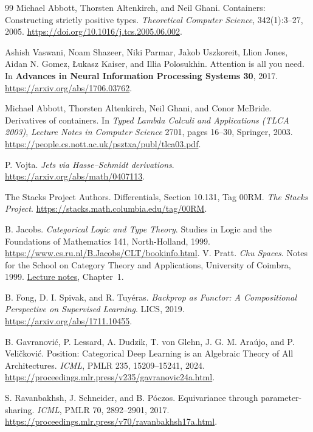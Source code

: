 \documentclass[11pt,a4paper]{article}
\theoremstyle{definition}
\theoremstyle{remark}\newaliascnt{remark}{theorem}
\numberwithin{equation}{section}
\begin{document}
\begin{thebibliography}{99}
Michael Abbott, Thorsten Altenkirch, and Neil Ghani.
\newblock Containers: Constructing strictly positive types.
\newblock \emph{Theoretical Computer Science}, 342(1):3--27, 2005.
\newblock \url{https://doi.org/10.1016/j.tcs.2005.06.002}.

Ashish Vaswani, Noam Shazeer, Niki Parmar, Jakob Uszkoreit,
Llion Jones, Aidan N. Gomez, \L ukasz Kaiser, and Illia Polosukhin.
\newblock Attention is all you need.
\newblock In \textbf{Advances in Neural Information Processing Systems 30},
2017.
\newblock \url{https://arxiv.org/abs/1706.03762}.

Michael Abbott, Thorsten Altenkirch, Neil Ghani, and Conor McBride.
\newblock Derivatives of containers.
\newblock In \emph{Typed Lambda Calculi and Applications (TLCA 2003)},
\emph{Lecture Notes in Computer Science} 2701, pages 16--30, Springer, 2003.
\newblock \url{https://people.cs.nott.ac.uk/psztxa/publ/tlca03.pdf}.

P. Vojta. \emph{Jets via Hasse--Schmidt derivations}.
\url{https://arxiv.org/abs/math/0407113}.

The Stacks Project Authors.
\newblock Differentials, Section 10.131, Tag 00RM.
\newblock \emph{The Stacks Project}.
\newblock \url{https://stacks.math.columbia.edu/tag/00RM}.

 B. Jacobs.
\emph{Categorical Logic and Type Theory}. Studies in Logic and the Foundations of Mathematics 141, North-Holland, 1999.
\url{https://www.cs.ru.nl/B.Jacobs/CLT/bookinfo.html}.
 V. Pratt. \emph{Chu Spaces}. Notes for the School on Category Theory and Applications, University of Coimbra, 1999.
\href{https://ncatlab.org/nlab/files/Pratt-ChuSpaces.pdf}{Lecture notes}, Chapter~1.

B. Fong, D. I. Spivak, and R. Tuy\'eras.
\emph{Backprop as Functor: A Compositional Perspective on Supervised Learning}.
LICS, 2019. \url{https://arxiv.org/abs/1711.10455}.

B. Gavranovi\'c, P. Lessard, A. Dudzik, T. von Glehn, J. G. M. Ara\'ujo, and P. Veli\v{c}kovi\'c.
Position: Categorical Deep Learning is an Algebraic Theory of All Architectures.
\emph{ICML}, PMLR 235, 15209--15241, 2024.
\url{https://proceedings.mlr.press/v235/gavranovic24a.html}.

S. Ravanbakhsh, J. Schneider, and B. P\'oczos.
Equivariance through parameter-sharing. \emph{ICML}, PMLR 70, 2892--2901, 2017.
\url{https://proceedings.mlr.press/v70/ravanbakhsh17a.html}.


\end{thebibliography}
\end{document}
